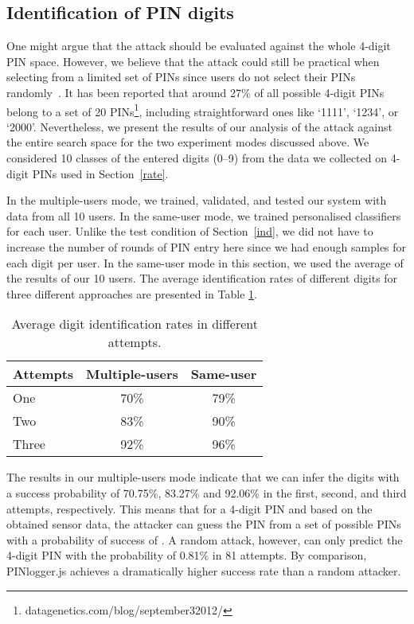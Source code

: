 \documentclass[10pt,twocolumn]{article}
\begin{document}
\subsection{Identification of PIN digits}
One might argue that the attack should be evaluated against the whole 4-digit PIN space. However, we believe that the attack could still be practical when selecting from a limited set of PINs since users do not select their PINs randomly~\cite{randomPINs}. It has been reported that around 27\% of all possible 4-digit PINs belong to a set of 20 PINs\footnote{datagenetics.com/blog/september32012/}, including straightforward ones like `1111', `1234', or `2000'. 
Nevertheless, we present the results of our analysis of the attack against the entire search space for the two experiment modes discussed above. We considered 10 classes of the entered digits (0--9) from the data we collected on 4-digit PINs used in Section~\ref{rate}.

In the multiple-users mode, we trained, validated, and tested our system with data from all 10 users. In the same-user mode, we trained personalised classifiers for each user. 
Unlike the test condition of Section~\ref{ind}, we did not have to increase the number of rounds of PIN entry here since we had enough samples for each digit per user. In the same-user mode in this section, we used the average of the results of our 10 users.  
The average identification rates of different digits for three different approaches are presented in Table \ref{allusersDigits}.
\begin{table}[t]
\centering
\begin{tabular}{|l|c|c|}
\hline
Attempts  
& Multiple-users & Same-user \\ 
\hline
One & 70\% & 79\% \\
Two & 83\% & 90\%\\
Three & 92\% & 96\% \\
\hline
\end{tabular}
\caption {Average digit identification rates in different attempts.}
\label{allusersDigits}
\end{table}


The results in our multiple-users mode indicate that we can infer the digits with a success probability of 70.75\%, 83.27\% and 92.06\% in the first, second, and third attempts, respectively. 
This means that for a 4-digit PIN and based on the obtained sensor data, the attacker can guess the PIN from a set of  possible PINs with a probability of success of . 
A random attack, however, can only predict the 4-digit PIN with the probability of 0.81\% in 81 attempts. By comparison, PINlogger.js achieves a dramatically higher success rate than a random attacker.
\end{document}
